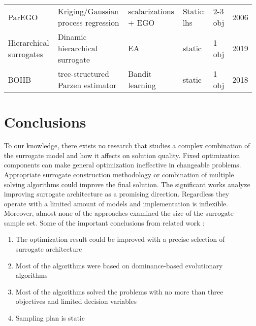 \begin{table}[]
{\begin{tabular}{@{}llllll@{}}
            ParEGO                              & Kriging/Gaussian process regression   & scalarizations + EGO        & Static: lhs   & 2-3 obj                  & 2006 \\
            Hierarchical surrogates             & Dinamic hierarchical surrogate        & EA                          & static        & 1 obj                    & 2019 \\
            BOHB                                & tree-structured Parzen estimator      & Bandit learning             & static        & 1 obj                    & 2018
            \end{tabular}%
            }
        \end{table}

    \section{Conclusions}

        To our knowledge, there exists no research that studies a complex combination of the surrogate model and how it affects on solution quality.  Fixed optimization components can make general optimization ineffective in changeable problems. Appropriate surrogate construction methodology or combination of multiple solving algorithms could improve the final solution. The significant works analyze improving surrogate architecture as a promising direction. Regardless they operate with a limited amount of models and implementation is inflexible. Moreover, almost none of the approaches examined the size of the surrogate sample set. 
        Some of the important conclusions from related work \cite{SoftSurvey}:
        \begin{enumerate}
            \item The optimization result could be improved with a precise selection of surrogate architecture
            \item Most of the algorithms were based on dominance-based evolutionary algorithms
            \item Most of the algorithms solved the problems with no more than three objectives and limited decision variables
            \item Sampling plan is static
        \end{enumerate}


